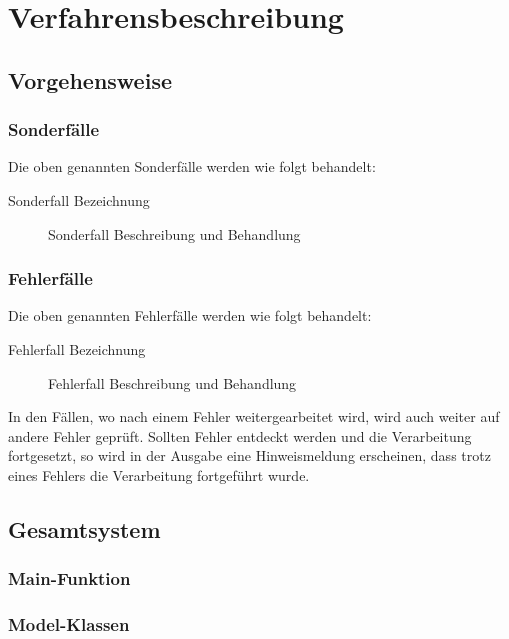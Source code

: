 \chapter{Verfahrensbeschreibung}
\label{chap:Verfahrensbeschreibung}
\section{Vorgehensweise}

\subsection*{Sonderfälle}

Die oben genannten Sonderfälle werden wie folgt behandelt:
\begin{description}
	\item[Sonderfall Bezeichnung] Sonderfall Beschreibung und Behandlung 
\end{description}

\subsection*{Fehlerfälle}

Die oben genannten Fehlerfälle werden wie folgt behandelt:
\begin{description}
	\item [Fehlerfall Bezeichnung] Fehlerfall Beschreibung und Behandlung
\end{description}

In den Fällen, wo nach einem Fehler weitergearbeitet wird, wird auch weiter auf andere Fehler geprüft. Sollten Fehler entdeckt werden und die Verarbeitung fortgesetzt, so wird in der Ausgabe eine Hinweismeldung erscheinen, dass trotz eines Fehlers die Verarbeitung fortgeführt wurde.

\section{Gesamtsystem}
\subsection{Main-Funktion}

\subsection{Model-Klassen}

